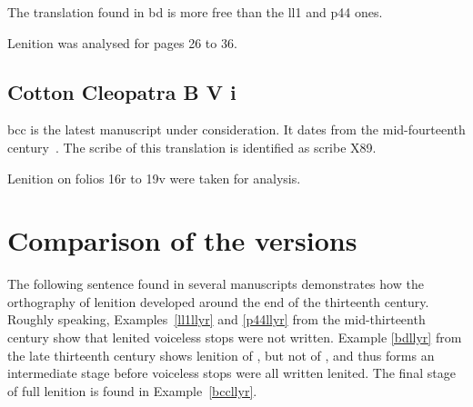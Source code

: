 The translation found in \gls{bd} is more free than the \gls{ll1} and \gls{p44} ones.


Lenition was analysed for pages 26 to 36.
\subsection{Cotton Cleopatra B V i}
\label{sec:cotton-cleopatra-b}
\Gls{bcc} is the latest manuscript under consideration.
It dates from the mid-fourteenth century~\autocite[xlv]{roberts_astudiaeth_1969}.
The scribe of this  translation is identified as scribe X89\autocite{_tei_???}. 

Lenition on folios 16r to 19v were taken for analysis.

\section{Comparison of the versions}
\label{sec:comparison-versions}
The following sentence found in several manuscripts demonstrates how the orthography of lenition developed around the end of the thirteenth century.
Roughly speaking, Examples~\ref{ll1llyr} and \ref{p44llyr} from the mid-thirteenth century show that lenited voiceless stops were not written.
Example \ref{bdllyr} from the late thirteenth century shows lenition of , but not of , and thus forms an intermediate stage before voiceless stops were all written lenited.
The final stage of full lenition is found in Example~\ref{bccllyr}.

